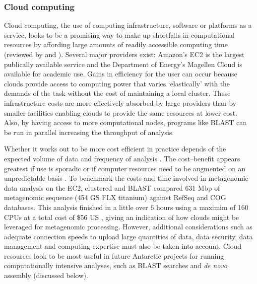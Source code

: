 \subsubsection{Cloud computing}
Cloud computing, the use of computing infrastructure, software or platforms as a service, looks to be a promising way to make up shortfalls in computational resources by affording large amounts of readily accessible computing time (reviewed by \citet{Schatz2010} and \citet{Thakur2012}).
Several major providers exist: Amazon's \ac{EC2} is the largest publically available service and the Department of Energy's Magellen Cloud is available for academic use.
Gains in efficiency for the user can occur because clouds provide access to computing power that varies `elastically' with the demands of the task without the cost of maintaining a local cluster.
These infrastructure costs are more effectively absorbed by large providers than by smaller facilities enabling clouds to provide the same resources at lower cost.
Also, by having access to more computational nodes, programs like \acs{BLAST} can be run in parallel increasing the throughput of analysis.

Whether it works out to be more cost efficient in practice depends of the expected volume of data and frequency of analysis \cite{Wilkening2009}.
The cost--benefit appears greatest if use is sporadic or if computer resources need to be augmented on an unpredictable basis \cite{Wilkening2009}.
To benchmark the costs and time involved in metagenomic data analysis on the \ac{EC2}, \citet{Angiuoli2011} clustered and \acs{BLAST} compared 631 Mbp of metagenomic sequence (454 GS FLX titanium) against RefSeq and \acs{COG} databases.
This analysis finished in a little over 6 hours using a maximim of 160 \acs{CPU}s at a total cost of \$56 US \cite{Angiuoli2011}, giving an indication of how clouds might be leveraged for metagenomic processing.
However, additional considerations such as adequate connection speeds to upload large quantities of data, data security, data management and computing expertise must also be taken into account.
Cloud resources look to be most useful in future Antarctic projects for running computationally intensive analyses, such as \acs{BLAST} searches and \emph{de novo} assembly (discussed below).

